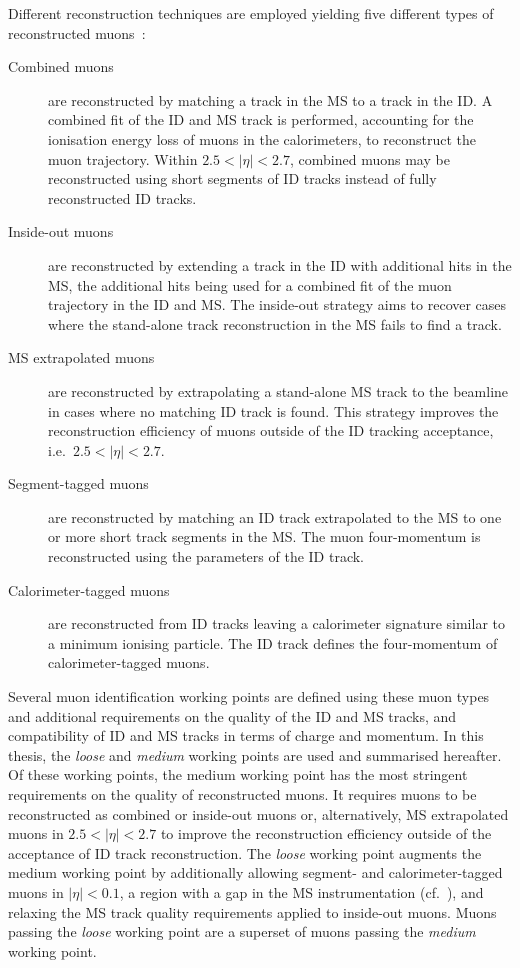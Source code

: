 Different reconstruction techniques are employed yielding five different types
of reconstructed muons~\cite{MUON-2018-03}:
\begin{description}

\item[Combined muons] are reconstructed by matching a track in the MS to a track
  in the ID. A combined fit of the ID and MS track is performed, accounting for
  the ionisation energy loss of muons in the calorimeters, to reconstruct the
  muon trajectory. Within $2.5 < |\eta| < 2.7$, combined muons may be
  reconstructed using short segments of ID tracks instead of fully reconstructed
  ID tracks.

\item[Inside-out muons] are reconstructed by extending a track in the ID with
  additional hits in the MS, the additional hits being used for a combined fit
  of the muon trajectory in the ID and MS. The inside-out strategy aims to
  recover cases where the stand-alone track reconstruction in the MS fails to
  find a track.

\item[MS extrapolated muons] are reconstructed by extrapolating a stand-alone MS
  track to the beamline in cases where no matching ID track is found. This
  strategy improves the reconstruction efficiency of muons outside of the ID
  tracking acceptance, i.e.\ $2.5 < |\eta| < 2.7$.

\item[Segment-tagged muons] are reconstructed by matching an ID track
  extrapolated to the MS to one or more short track segments in the MS. The muon
  four-momentum is reconstructed using the parameters of the ID track.

\item[Calorimeter-tagged muons] are reconstructed from ID tracks leaving a
  calorimeter signature similar to a minimum ionising particle. The ID track
  defines the four-momentum of calorimeter-tagged muons.

\end{description}
Several muon identification working points are defined using these muon types
and additional requirements on the quality of the ID and MS tracks, and
compatibility of ID and MS tracks in terms of charge and momentum. In this
thesis, the \emph{loose} and \emph{medium} working points are used and
summarised hereafter. Of these working points, the medium working point has the
most stringent requirements on the quality of reconstructed muons. It requires
muons to be reconstructed as combined or inside-out muons or, alternatively, MS
extrapolated muons in $2.5 < |\eta| < 2.7$ to improve the reconstruction
efficiency outside of the acceptance of ID track reconstruction. The
\emph{loose} working point augments the medium working point by additionally
allowing segment- and calorimeter-tagged muons in $|\eta| < 0.1$, a region with
a gap in the MS instrumentation (cf.~), and relaxing the MS
track quality requirements applied to inside-out muons. Muons passing the
\emph{loose} working point are a superset of muons passing the \emph{medium}
working point.

